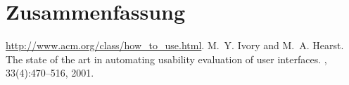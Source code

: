\documentclass[ngerman]{seminarvorlage}
\begin{document}
\section{Zusammenfassung}
\pagebreak

%
\begin{thebibliography}{9}
\newblock \url{http://www.acm.org/class/how_to_use.html}.
%
M.~Y. Ivory and M.~A. Hearst.
\newblock The state of the art in automating usability evaluation of user
  interfaces.
, 33(4):470--516, 2001.

\end{thebibliography}


\end{document}
